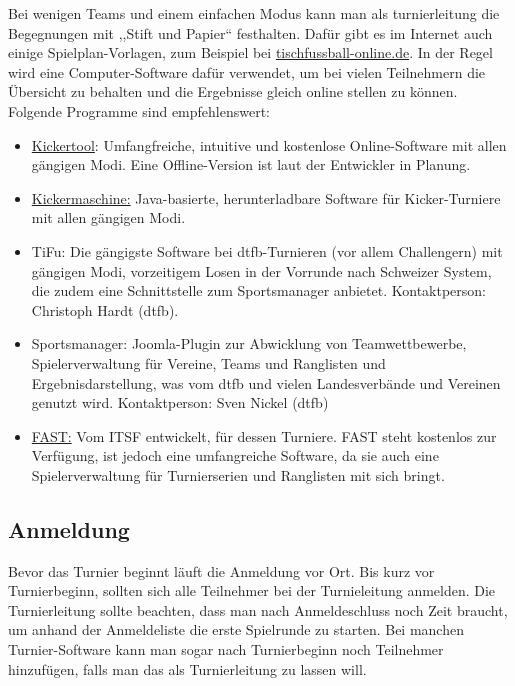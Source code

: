 Bei wenigen Teams und einem einfachen Modus kann man als \gls{turnierleitung} die Begegnungen mit ,,Stift und Papier`` festhalten. Dafür gibt es im Internet auch einige Spielplan-Vorlagen, zum Beispiel bei \href{http://www.tischfussball-online.com/dies-das/turnierplaene.html}{tischfussball-online.de}. In der Regel wird eine Computer-Software dafür verwendet, um bei vielen Teilnehmern die Übersicht zu behalten und die Ergebnisse gleich online stellen zu können. Folgende Programme sind empfehlenswert:
\begin{itemize}
\item \href{http://kickertool.de/}{Kickertool}: Umfangfreiche, intuitive und kostenlose Online-Software mit allen gängigen Modi. Eine Offline-Version ist laut der Entwickler in Planung.
\item \href{http://www.heise.de/download/kickermaschine-1191093.html}{Kickermaschine:} Java-basierte, herunterladbare Software für Kicker-Turniere mit allen gängigen Modi.
\item TiFu: Die gängigste Software bei \gls{dtfb}-Turnieren (vor allem  Challengern) mit gängigen Modi, vorzeitigem Losen in der Vorrunde nach Schweizer System, die zudem eine Schnittstelle zum Sportsmanager anbietet. Kontaktperson: Christoph Hardt (\gls{dtfb}).
\item Sportsmanager: Joomla-Plugin zur Abwicklung von Teamwettbewerbe, Spielerverwaltung für  Vereine, Teams und Ranglisten und Ergebnisdarstellung, was vom \gls{dtfb} und vielen Landesverbände und Vereinen genutzt wird.  Kontaktperson: Sven Nickel (\gls{dtfb})
\item \href{http://www.table-soccer.org/page/fast}{FAST:} Vom ITSF entwickelt, für dessen Turniere. FAST steht kostenlos zur Verfügung, ist jedoch eine umfangreiche Software, da sie auch eine Spielerverwaltung für Turnierserien und Ranglisten mit sich bringt.
\end{itemize}

\subsection{Anmeldung}
\label{turniere:durchfuehrung:anmeldung}

Bevor das Turnier beginnt läuft die Anmeldung vor Ort. Bis kurz vor Turnierbeginn, sollten sich alle Teilnehmer bei der Turnieleitung anmelden. Die Turnierleitung sollte beachten, dass man nach Anmeldeschluss noch Zeit braucht, um anhand der Anmeldeliste die erste Spielrunde zu starten. Bei manchen Turnier-Software kann man sogar nach Turnierbeginn noch Teilnehmer hinzufügen, falls man das als Turnierleitung zu lassen will.


